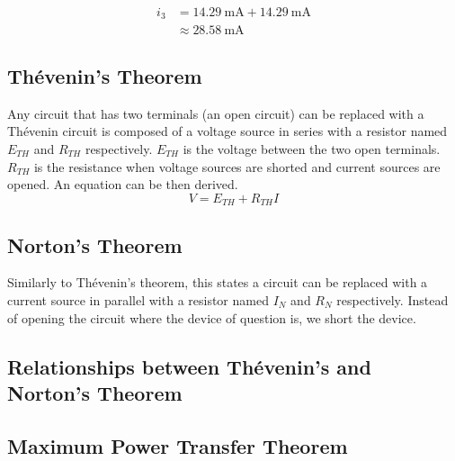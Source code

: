 \documentclass{template}
\begin{document}
\begin{align*}
    i_{3}  &= \SI{14.29}{\milli\ampere} + \SI{14.29}{\milli\ampere} \\
            &\approx \SI{28.58}{\milli\ampere}
\end{align*}

\newpage
\subsection{Th\'evenin's Theorem}
Any circuit that has two terminals (an open circuit) can be replaced with a Th\'evenin circuit is composed of a voltage source in series with a resistor named $E_{TH}$ and $R_{TH}$ respectively. $E_{TH}$ is the voltage between the two open terminals. $R_{TH}$ is the resistance when voltage sources are shorted and current sources are opened. An equation can be then derived. 
$$V=E_{TH}+R_{TH}I$$


\newpage
\subsection{Norton's Theorem}
Similarly to Th\'evenin's theorem, this states a circuit can be replaced with a current source in parallel with a resistor named $I_{N}$ and $R_{N}$ respectively. Instead of opening the circuit where the device of question is, we short the device.


\newpage
\subsection{Relationships between Th\'evenin's and Norton's Theorem}


\subsection{Maximum Power Transfer Theorem}
\end{document}
